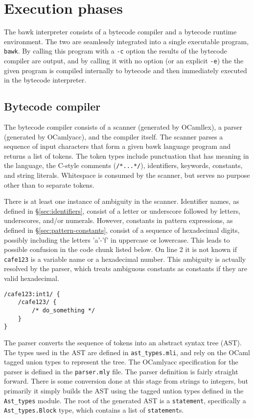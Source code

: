 \section{Execution phases}
The bawk interpreter consists of a bytecode compiler and a bytecode runtime environment.  The two are seamlessly integrated into a single executable program, \texttt{bawk}.  By calling this program with a \texttt{-c} option the results of the bytecode compiler are output, and by calling it with no option (or an explicit \texttt{-e}) the the given program is compiled internally to bytecode and then immediately executed in the bytecode interpreter.

\subsection{Bytecode compiler}
\label{sec:bytecode-compiler}
The bytecode compiler consists of a scanner (generated by OCamllex), a parser (generated by OCamlyacc), and the compiler itself.  The scanner parses a sequence of input characters that form a given bawk language program and returns a list of tokens.  The token types include punctuation that has meaning in the language, the C-style comments (\texttt{/*...*/}), identifiers, keywords, constants, and string literals.  Whitespace is consumed by the scanner, but serves no purpose other than to separate tokens.

There is at least one instance of ambiguity in the scanner.  Identifier names, as defined in \S\ref{sec:identifiers}, consist of a letter or underscore followed by letters, underscores, and/or numerals.  However, constants in pattern expressions, as defined in \S\ref{sec:pattern-constants}, consist of a sequence of hexadecimal digits, possibly including the letters 'a'-'f' in uppercase or lowercase.  This leads to possible confusion in the code chunk listed below.  On line 2 it is not known if \texttt{cafe123} is a variable name or a hexadecimal number.  This ambiguity is actually resolved by the parser, which treats ambiguous constants as constants if they are valid hexadecimal.

\begin{lstlisting}[caption=Possibly ambiguous code]
/cafe123:int1/ {
	/cafe123/ {
		/* do_something */
	}
}
\end{lstlisting}

The parser converts the sequence of tokens into an abstract syntax tree (AST).  The types used in the AST are defined in \texttt{ast\_types.mli}, and rely on the OCaml tagged union types to represent the tree.  The OCamlyacc specification for the parser is defined in the \texttt{parser.mly} file.  The parser definition is fairly straight forward.  There is some conversion done at this stage from strings to integers, but primarily it simply builds the AST using the tagged untion types defined in the \texttt{Ast\_types} module.  The root of the generated AST is a \texttt{statement}, specifically a \texttt{Ast\_types.Block} type, which contains a list of \texttt{statement}s.

